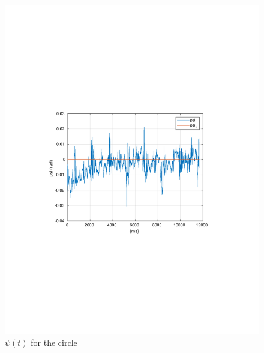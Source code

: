 \begin{frame}
		\begin{figure}[!htb]
			\centering
			\includegraphics[scale=.7,trim={3.5cm 8cm 4cm 8cm},clip]{figuras/CROB_Fuzzy_vel01_a05_circleXY/psi.pdf}
			\caption{$\psi(t)$ for the circle}
			\label{fig:crob_circ_psi}
		\end{figure}
\end{frame}
